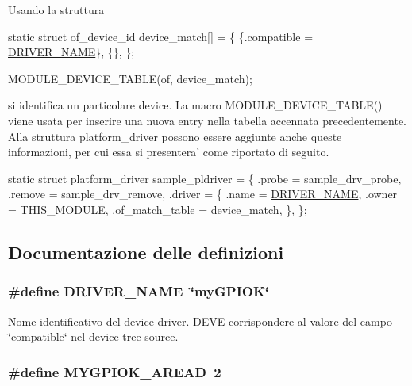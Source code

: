 Usando la struttura


\begin{DoxyCode}
\textcolor{keyword}{static} \textcolor{keyword}{struct }of\_device\_id device\_match[] = \{
        \{.compatible = \hyperlink{group___kernel-_module_ga25634d21648ca7fb7a2aca614bafaaeb}{DRIVER\_NAME}\},
        \{\},
\};

MODULE\_DEVICE\_TABLE(of, device\_match);
\end{DoxyCode}


si identifica un particolare device. La macro M\+O\+D\+U\+L\+E\+\_\+\+D\+E\+V\+I\+C\+E\+\_\+\+T\+A\+B\+L\+E() viene usata per inserire una nuova entry nella tabella accennata precedentemente. Alla struttura platform\+\_\+driver possono essere aggiunte anche queste informazioni, per cui essa si presentera' come riportato di seguito.


\begin{DoxyCode}
\textcolor{keyword}{static} \textcolor{keyword}{struct }platform\_driver sample\_pldriver = \{
    .probe  = sample\_drv\_probe,
    .remove = sample\_drv\_remove,
    .driver = \{
        .name  = \hyperlink{group___kernel-_module_ga25634d21648ca7fb7a2aca614bafaaeb}{DRIVER\_NAME},
        .owner = THIS\_MODULE,
        .of\_match\_table = device\_match,
    \},
\};
\end{DoxyCode}
 

\subsection{Documentazione delle definizioni}
\hypertarget{group___kernel-_module_ga25634d21648ca7fb7a2aca614bafaaeb}{
\subsubsection[{D\+R\+I\+V\+E\+R\+\_\+\+N\+A\+M\+E}]{\setlength{\rightskip}{0pt plus 5cm}\#define D\+R\+I\+V\+E\+R\+\_\+\+N\+A\+M\+E~\char`\"{}my\+G\+P\+I\+O\+K\char`\"{}}}\label{group___kernel-_module_ga25634d21648ca7fb7a2aca614bafaaeb}


Nome identificativo del device-\/driver. D\+E\+V\+E corrispondere al valore del campo \char`\"{}compatible\char`\"{} nel device tree source. 

\hypertarget{group___kernel-_module_ga2ae183c0bf8cbddbd7337f6b8a3d598b}{
\subsubsection[{M\+Y\+G\+P\+I\+O\+K\+\_\+\+A\+R\+E\+A\+D}]{\setlength{\rightskip}{0pt plus 5cm}\#define M\+Y\+G\+P\+I\+O\+K\+\_\+\+A\+R\+E\+A\+D~2}}\label{group___kernel-_module_ga2ae183c0bf8cbddbd7337f6b8a3d598b}


